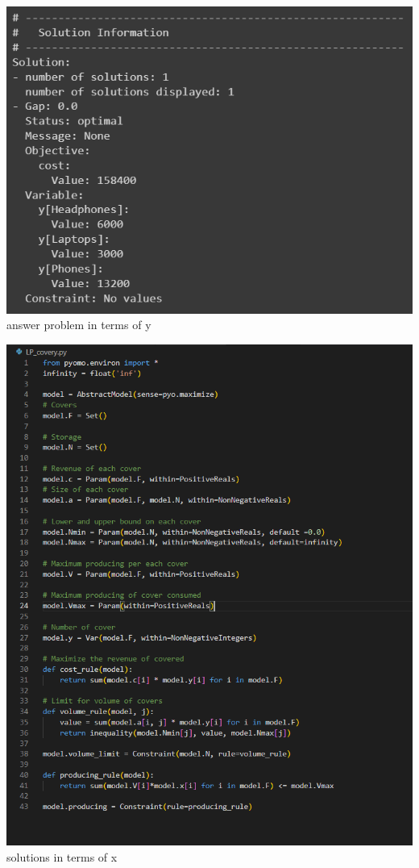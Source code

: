\begin{center}
    \includegraphics[scale=0.58]{pictures/task_11_yans.png} \\
    answer problem in terms of y
\end{center}

\begin{center}
\includegraphics[scale=0.9]{pictures/task_11_xpy.png} \\
solutions in terms of x
\end{center}

